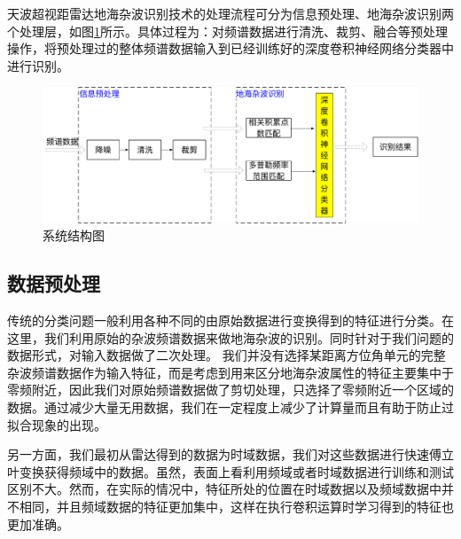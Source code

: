 天波超视距雷达地海杂波识别技术的处理流程可分为信息预处理、地海杂波识别两个处理层，如图\ref{fig:system}所示。具体过程为：对频谱数据进行清洗、裁剪、融合等预处理操作，将预处理过的整体频谱数据输入到已经训练好的深度卷积神经网络分类器中进行识别。

\begin{figure}[H]
	\centering
	\includegraphics[width=\textwidth]{figures/othr/system}
	\caption{系统结构图}
	\label{fig:system}
\end{figure}

\subsection{数据预处理}
传统的分类问题一般利用各种不同的由原始数据进行变换得到的特征进行分类。在这里，我们利用原始的杂波频谱数据来做地海杂波的识别。同时针对于我们问题的数据形式，对输入数据做了二次处理。
我们并没有选择某距离方位角单元的完整杂波频谱数据作为输入特征，而是考虑到用来区分地海杂波属性的特征主要集中于零频附近，因此我们对原始频谱数据做了剪切处理，只选择了零频附近一个区域的数据。通过减少大量无用数据，我们在一定程度上减少了计算量而且有助于防止过拟合现象的出现。

另一方面，我们最初从雷达得到的数据为时域数据，我们对这些数据进行快速傅立叶变换获得频域中的数据。虽然，表面上看利用频域或者时域数据进行训练和测试区别不大。然而，在实际的情况中，特征所处的位置在时域数据以及频域数据中并不相同，并且频域数据的特征更加集中，这样在执行卷积运算时学习得到的特征也更加准确。


